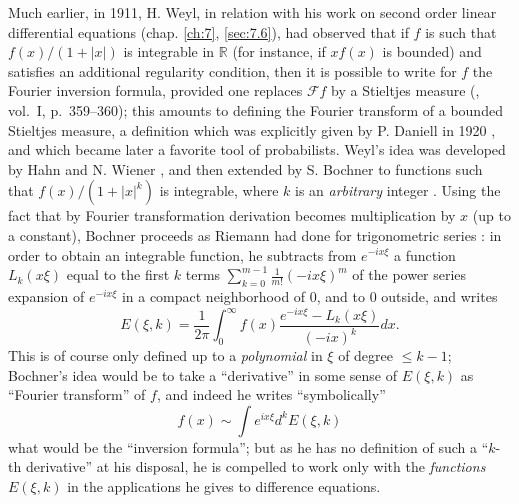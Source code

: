 \documentclass[12pt,a4paper,leqno,twoside]{extbook}
\newcommand{\R}{\mathbb{R}}
\begin{document}
Much earlier, in 1911, H. Weyl, in relation with his work on second order linear differential equations (chap. \ref{ch:7}, \ref{sec:7.6}), had observed that if \(f\) is such that \(f(x)/(1 + |x|)\) is integrable in \(\R\) (for instance, if \(xf(x)\) is bounded) and satisfies an additional regularity condition, then it is possible to write for \(f\) the Fourier inversion formula, provided one replaces \(\mathcal{F}f\) by a Stieltjes measure (\cite{227}, vol.~I, p.~359--360); this amounts to defining the Fourier transform of a bounded Stieltjes measure, a definition which was explicitly given by P. Daniell in 1920 \cite{046}, and which became later a favorite tool of probabilists. Weyl's idea was developed by Hahn \cite{096} and N. Wiener \cite{229}, and then extended by S. Bochner to functions such that \(f(x)/(1+|x|^k)\) is integrable, where \(k\) is an \emph{arbitrary} integer \cite{024}. Using the fact that by Fourier transformation derivation becomes multiplication by \(x\) (up to a constant), Bochner proceeds as Riemann had done for trigonometric series \cite[p.~245]{182}: in order to obtain an integrable function, he subtracts from \(e^{-ix\xi}\) a function \(L_k(x\xi)\) equal to the first \(k\) terms \(\sum\limits_{k=0}^{m-1} \frac{1}{m!} (-ix\xi)^m\) of the power series expansion of \(e^{-ix\xi}\) in a compact neighborhood of 0, and to 0 outside, and writes
\begin{equation}
    \label{eq:8.11}
    E(\xi, k) = \frac{1}{2\pi} \int_0^\infty f(x) \frac{e^{-ix\xi} -L_k(x\xi)}{(-ix)^k} dx.
\end{equation}
This is of course only defined up to a \emph{polynomial} in \(\xi\) of degree \(\leq k-1\); Bochner's idea would be to take a ``derivative'' in some sense of \(E(\xi, k)\) as ``Fourier transform'' of \(f\), and indeed he writes ``symbolically''
\[
    f(x) \sim{} \int e^{ix\xi} d^k E(\xi, k)
\]
what would be the ``inversion formula''; but as he has no definition of such a ``\(k\)-th derivative'' at his disposal, he is compelled to work only with the \emph{functions} \(E(\xi, k)\) in the applications he gives to difference equations.
\end{document}
